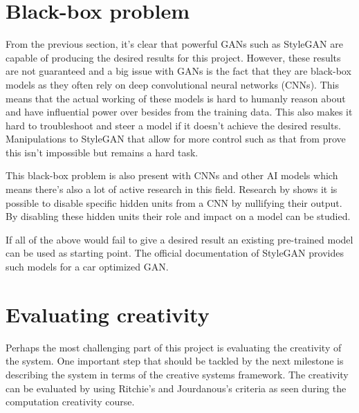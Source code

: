 
\section{Black-box problem}
\label{sec:black_box_problem}

From the previous section, it's clear that powerful GANs such as StyleGAN are capable of producing the desired results for this project.
However, these results are not guaranteed and a big issue with GANs is the fact that they are black-box models as they often rely on deep convolutional neural networks (CNNs).
This means that the actual working of these models is hard to humanly reason about and have influential power over besides from the training data.
This also makes it hard to troubleshoot and steer a model if it doesn't achieve the desired results.
Manipulations to StyleGAN that allow for more control such as that from \citet{rigstylegan} prove this isn't impossible but remains a hard task.

This black-box problem is also present with CNNs and other AI models which means there's also a lot of active research in this field.
Research by \citet{CNNrigging} shows it is possible to disable specific hidden units from a CNN by nullifying their output.
By disabling these hidden units their role and impact on a model can be studied.  

If all of the above would fail to give a desired result an existing pre-trained model can be used as starting point.
The official documentation of StyleGAN provides such models for a car optimized GAN.


\clearpage
\section{Evaluating creativity}
\label{sec:evaluating_creativity}

Perhaps the most challenging part of this project is evaluating the creativity of the system.
One important step that should be tackled by the next milestone is describing the system in terms of the creative systems framework.
The creativity can be evaluated by using Ritchie's and Jourdanous’s criteria as seen during the computation creativity course.

